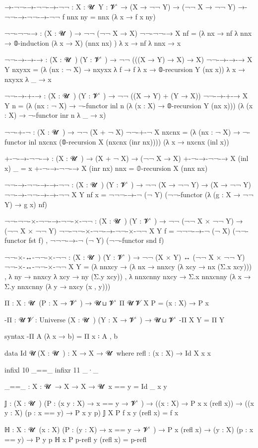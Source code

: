 →-¬¬-→-¬¬-→-¬¬ : {X : 𝓤 ̇ } {Y : 𝓥 ̇ } → (X → ¬¬ Y) → (¬¬ X → ¬¬ Y)
→-¬¬-→-¬¬-→-¬¬ f nnx ny = nnx (λ x → f x ny)

¬¬-¬¬-→ : (X : 𝓤 ̇ ) → ¬¬ (¬¬ X → X)
¬¬-¬¬-→ X nf = (λ nx → nf λ nnx → 𝟘-induction (λ x → X) (nnx nx) ) λ x → nf λ nnx → x

¬¬-→-→-→ : (X : 𝓤 ̇ ) (Y : 𝓥 ̇ ) → ¬¬ (((X → Y) → X) → X)
¬¬-→-→-→ X Y nxyxx = (λ (nx : ¬ X) → nxyxx λ f → f λ x → 𝟘-recursion Y (nx x)) λ x → nxyxx λ _ → x

¬¬-→-+-→ : (X : 𝓤 ̇ ) (Y : 𝓥 ̇ ) → ¬¬ ((X → Y) + (Y → X))
¬¬-→-+-→ X Y n = (λ (nx : ¬ X) → ¬-functor inl n (λ (x : X) → 𝟘-recursion Y (nx x))) (λ (x : X) → ¬-functor inr n λ _ → x) 

¬¬-+-¬ : (X : 𝓤 ̇ ) → ¬¬ (X + ¬ X)
¬¬-+-¬ X nxcnx = (λ (nx : ¬ X) → ¬-functor inl nxcnx (𝟘-recursion X (nxcnx (inr nx)))) (λ x → nxcnx (inl x))

+-¬-→-¬¬-→ : (X : 𝓤 ̇ ) → (X + ¬ X) → (¬¬ X → X)
+-¬-→-¬¬-→ X (inl x) _ = x
+-¬-→-¬¬-→ X (inr nx) nnx = 𝟘-recursion X (nnx nx)

¬¬-→-¬¬-→-→-¬¬ : (X : 𝓤 ̇ ) (Y : 𝓥 ̇ ) → ¬¬ (X → ¬¬ Y) → (X → ¬¬ Y)
¬¬-→-¬¬-→-→-¬¬ X Y nf x = ¬¬¬-→-¬ (¬ Y) (¬¬-functor (λ (g : X → ¬¬ Y) → g x) nf)

¬¬-¬¬-×-¬¬-→-¬¬-×-¬¬ : (X : 𝓤 ̇ ) (Y : 𝓥 ̇ ) → ¬¬ (¬¬ X × ¬¬ Y) → (¬¬ X × ¬¬ Y)
¬¬-¬¬-×-¬¬-→-¬¬-×-¬¬ X Y f = ¬¬¬-→-¬ (¬ X) (¬¬-functor fst f) , ¬¬¬-→-¬ (¬ Y) (¬¬-functor snd f) 

¬¬-×-↔-¬¬-×-¬¬ : (X : 𝓤 ̇ ) (Y : 𝓥 ̇ ) → ¬¬ (X × Y) ↔ (¬¬ X × ¬¬ Y)
¬¬-×-↔-¬¬-×-¬¬ X Y = (λ nnxcy → (λ nx → nnxcy (λ xcy → nx (Σ.x xcy))) , λ ny → nnxcy λ xcy → ny (Σ.y xcy)) , λ nnxcnny nxcy → Σ.x nnxcnny (λ x → Σ.y nnxcnny (λ y → nxcy (x , y)))

Π : {X : 𝓤 ̇ } (P : X → 𝓥 ̇ ) → 𝓤 ⊔ 𝓥 ̇ 
Π {𝓤} {𝓥} {X} P = (x : X) → P x

-Π : {𝓤 𝓥 : Universe} (X : 𝓤 ̇ ) (Y : X → 𝓥 ̇ ) → 𝓤 ⊔ 𝓥 ̇ 
-Π X Y = Π Y

syntax -Π A (λ x → b) = Π x ꞉ A , b

data Id {𝓤} (X : 𝓤 ̇ ) : X → X → 𝓤 ̇ where
    refl : (x : X) → Id X x x

infixl 10 _==_
infixr 11 _·_

_==_ : {X : 𝓤 ̇ } → X → X → 𝓤 ̇
x == y = Id _ x y

𝕁 : (X : 𝓤 ̇ ) (P : (x y : X) → x == y → 𝓥 ̇ )
  → ((x : X) → P x x (refl x))
  → ((x y : X) (p : x == y) → P x y p)
𝕁 X P f x y (refl x) = f x

ℍ : {X : 𝓤 ̇ } (x : X) (P : (y : X) → x == y → 𝓥 ̇ )
  → P x (refl x)
  → (y : X) (p : x == y)
  → P y p 
ℍ x P p-refl y (refl x) = p-refl

